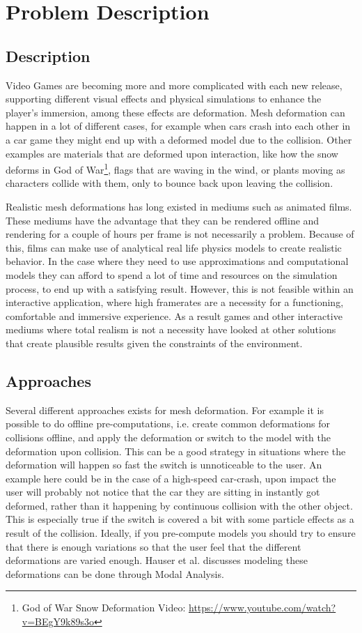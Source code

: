 \chapter{Problem Description}
\section{Description}
Video Games are becoming more and more complicated with each new release, supporting different visual effects and physical simulations
to enhance the player's immersion, among these effects are deformation. 
Mesh deformation can happen in a lot of different cases, for example when cars crash into each other in a car game they might end up with a deformed model due to the collision. 
Other examples are materials that are deformed upon interaction, like how the snow deforms in God of War\footnote{God of War Snow Deformation Video: \url{https://www.youtube.com/watch?v=BEgY9k89s3o}}, flags that are waving in the wind, or plants moving as characters collide with them, only to bounce back upon leaving the collision.

Realistic mesh deformations has long existed in mediums such as animated films.
These mediums have the advantage that they can be rendered offline and rendering for a couple of hours per frame is not necessarily a problem. 
Because of this, films can make use of analytical real life physics models to create realistic behavior.
In the case where they need to use approximations and computational models they can afford to spend a lot of time and resources on
the simulation process, to end up with a satisfying result.
However, this is not feasible within an interactive application, where high framerates are a necessity for a functioning,
comfortable and immersive experience. As a result games and other interactive mediums where total realism is not a necessity
have looked at other solutions that create plausible results given the constraints of the environment.

\section{Approaches}
Several different approaches exists for mesh deformation.
For example it is possible to do offline pre-computations, i.e. create common deformations for collisions offline, and apply the deformation or switch to the model with the deformation upon collision. 
This can be a good strategy in situations where the deformation will happen so fast the switch is unnoticeable to the user.
An example here could be in the case of a high-speed car-crash, upon impact the user will probably not notice that the car they are sitting in instantly got deformed,
rather than it happening by continuous collision with the other object. This is especially true if the switch is covered a bit with some particle effects as a result of the collision.
Ideally, if you pre-compute models you should try to ensure that there is enough variations so that the user feel that the different deformations are varied enough.
Hauser et al.\cite{hauser2003interactive} discusses modeling these deformations can be done through Modal Analysis.

